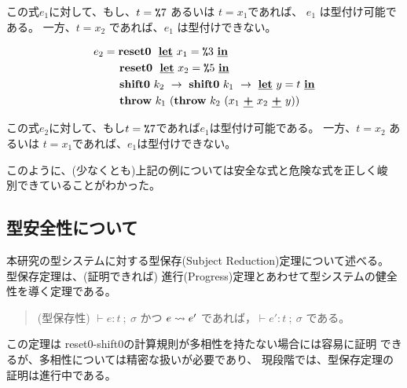 この式$e_1$に対して、もし、$t=\texttt{\%}{7}$ あるいは $t=x_1$であれば、
$e_1$ は型付け可能である。
一方、$t=x_2$ であれば、$e_1$ は型付けできない。

\begin{align*}
  e_2 & = \textbf{reset0} ~~\underline{\textbf{let}}~x_1=\texttt{\%}{3}~\underline{\textbf{in}} \\
      & \phantom{=}~~ \textbf{reset0} ~~\underline{\textbf{let}}~x_2=\texttt{\%}{5}~\underline{\textbf{in}} \\
      & \phantom{=}~~ \textbf{shift0}~k_2~\to~ \textbf{shift0}~k_1~\to~ \underline{\textbf{let}}~y=t~\underline{\textbf{in}} \\
      & \phantom{=}~~ \textbf{throw}~k_1~(\textbf{throw}~k_2~(x_1~\underline{\textbf{+}}~x_2~\underline{\textbf{+}}~y))
\end{align*}

この式$e_2$に対して、もし$t=\texttt{\%}{7}$であれば$e_1$は型付け可能である。
一方、$t=x_2$ あるいは $t=x_1$であれば、$e_1$は型付けできない。

このように、(少なくとも)上記の例については安全な式と危険な式を正しく峻
別できていることがわかった。

\subsection{型安全性について}

本研究の型システムに対する型保存(Subject Reduction)定理について述べる。
型保存定理は、(証明できれば)
進行(Progress)定理とあわせて型システムの健全性を導く定理である。

\begin{quote}
(型保存性)
$\vdash e:t~;~\sigma$ かつ $e \leadsto e'$ であれば，$\vdash e':t~;~\sigma$
である。
\end{quote}

この定理は reset0-shift0の計算規則が多相性を持たない場合には容易に証明
できるが、多相性については精密な扱いが必要であり、
現段階では、型保存定理の証明は進行中である。

